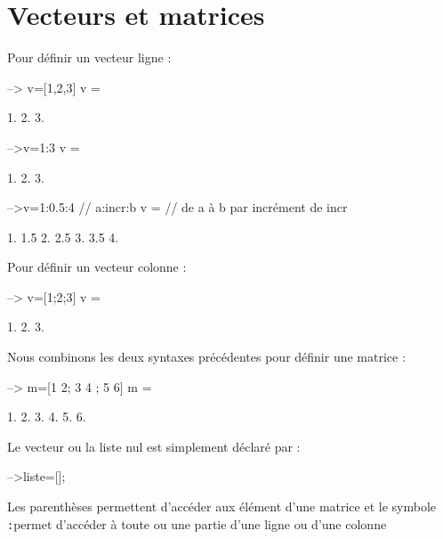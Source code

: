 \section{Vecteurs et matrices}
Pour définir un vecteur ligne :
\begin{Scilabcode}
--> v=[1,2,3]
 v  =
 
    1.    2.    3. 

-->v=1:3
 v  =
 
    1.    2.    3.

-->v=1:0.5:4        // a:incr:b
 v  =               // de a à b par incrément de incr
 
    1.    1.5    2.    2.5    3.    3.5    4.
\end{Scilabcode}
Pour définir un vecteur colonne :
\begin{Scilabcode}
--> v=[1;2;3]
 v  =
 
    1.    
    2.
    3. 
\end{Scilabcode}
Nous combinons les deux syntaxes précédentes pour définir une matrice : 
\begin{Scilabcode}
--> m=[1 2; 3 4 ; 5 6]
 m  =
 
    1.    2.  
    3.    4.  
    5.    6.  
\end{Scilabcode}
Le vecteur ou la liste nul est simplement déclaré par :
\begin{Scilabcode}
-->liste=[];
\end{Scilabcode}
Les parenthèses permettent d'accéder aux élément d'une matrice et le 
symbole \og\verb?:?\fg permet d'accéder à toute ou une partie d'une 
ligne ou d'une colonne
